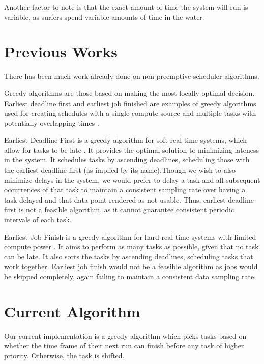 \documentclass{article}
\begin{document}
Another factor to note is that the exact amount of time the system will run is variable, as surfers spend variable amounts of time in the water.

\section{Previous Works}
There has been much work already done on non-preemptive scheduler algorithms.

Greedy algorithms are those based on making the most locally optimal decision. Earliest deadline first and earliest job finished are examples of greedy algorithms used for creating schedules with a single compute source and multiple tasks with potentially overlapping times \cite{Karger97}.

Earliest Deadline First is a greedy algorithm for soft real time systems, which allow for tasks to be late \cite{Karger97}. It provides the optimal solution to minimizing lateness in the system. It schedules tasks by ascending deadlines, scheduling those with the earliest deadline first (as implied by its name).Though we wish to also minimize delays in the system, we would prefer to delay a task and all subsequent occurrences of that task to maintain a consistent sampling rate over having a task delayed and that data point rendered as not usable. Thus, earliest deadline first is not a feasible algorithm, as it cannot guarantee consistent periodic intervals of each task.

Earliest Job Finish is a greedy algorithm for hard real time systems with limited compute power \cite{Karger97}. It aims to perform as many tasks as possible, given that no task can be late. It also sorts the tasks by ascending deadlines, scheduling tasks that work together. Earliest job finish would not be a feasible algorithm as jobs would be skipped completely, again failing to maintain a consistent data sampling rate.

\section{Current Algorithm}

Our current implementation is a greedy algorithm which picks tasks based on whether the time frame of their next run can finish before any task of higher priority. Otherwise, the task is shifted.
\end{document}
